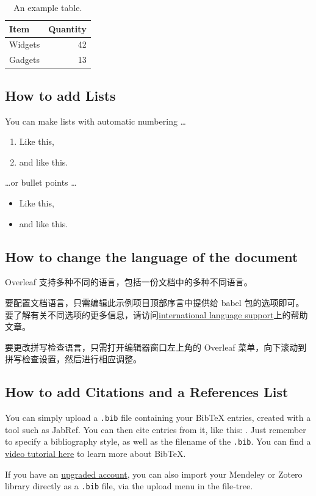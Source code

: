 \documentclass{article}
\begin{document}
\begin{table}
\centering
\begin{tabular}{l|r}
Item & Quantity \\\hline
Widgets & 42 \\
Gadgets & 13
\end{tabular}
\caption{\label{tab:widgets}An example table.}
\end{table} 

\subsection{How to add Lists}

You can make lists with automatic numbering \dots

\begin{enumerate}
\item Like this,
\item and like this.
\end{enumerate}
\dots or bullet points \dots
\begin{itemize}
\item Like this,
\item and like this.
\end{itemize}

\subsection{How to change the language of the document}

Overleaf 支持多种不同的语言，包括一份文档中的多种不同语言。

要配置文档语言，只需编辑此示例项目顶部序言中提供给 babel 包的选项即可。 要了解有关不同选项的更多信息，请访问\href{https://www.overleaf.com/learn/latex/International_language_support}{international language support}上的帮助文章。

要更改拼写检查语言，只需打开编辑器窗口左上角的 Overleaf 菜单，向下滚动到拼写检查设置，然后进行相应调整。

\subsection{How to add Citations and a References List}

You can simply upload a \verb|.bib| file containing your BibTeX entries, created with a tool such as JabRef. You can then cite entries from it, like this: \cite{zhouxunzhe}. Just remember to specify a bibliography style, as well as the filename of the \verb|.bib|. You can find a \href{https://www.overleaf.com/help/97-how-to-include-a-bibliography-using-bibtex}{video tutorial here} to learn more about BibTeX.

If you have an \href{https://www.overleaf.com/user/subscription/plans}{upgraded account}, you can also import your Mendeley or Zotero library directly as a \verb|.bib| file, via the upload menu in the file-tree.



\end{document}

